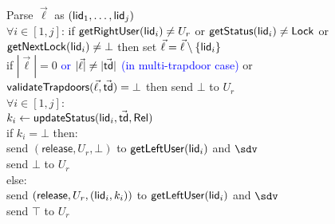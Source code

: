 \begin{figure*}[!h]
{\begin{minipage}[t]{0.50\textwidth}
{				Parse $\vec{\ell}$ as $(\mathsf{lid}_1,\ldots,\mathsf{lid}_j)$							\\
				$\forall i \in [1,j]$: if $\mathsf{getRightUser}(\mathsf{lid}_i) \neq U_r$ or 
				$\mathsf{getStatus}(\mathsf{lid}_i) \neq \mathsf{Lock}$ or 										\\
				$\mathsf{getNextLock}(\mathsf{lid}_i) \neq \bot$ then set $\vec{\ell} = \vec{\ell} \setminus 
				\{\mathsf{lid}_i\}$																\\
				if $|\vec{\ell}| = 0$ \textcolor{blue}{ or $|\vec{\ell}| \neq |\vec{\mathsf{td}}|$ (in 
				multi-trapdoor case)} or $\mathsf{validateTrapdoors}(\vec{\ell},\vec{\mathsf{td}}) = \bot$ 
				then send $\bot$ to $U_r$												\\
				$\forall i \in [1,j]$: 													\\
				\quad $k_i \gets \mathsf{updateStatus}(\mathsf{lid}_i, \vec{\mathsf{td}}, \mathsf{Rel})$					\\
				\quad if $k_i = \bot$ then:												\\
				\qquad send $(\mathsf{release},U_r,\bot)$ to $\mathsf{getLeftUser}(\mathsf{lid}_i)$ and 
				$\sdv$																	\\
				\qquad send $\bot$ to $U_r$												\\
				\quad else:																\\
				\qquad send $(\mathsf{release},U_r,(\mathsf{lid}_i, k_i))$ to $\mathsf{getLeftUser}(\mathsf{lid}_i)$ and 
				$\sdv$																	\\
				\qquad send $\top$ to $U_r$
			}
		\end{minipage}
		\begin{minipage}[t]{0.45\textwidth}
\end{minipage}}
\end{figure*}
